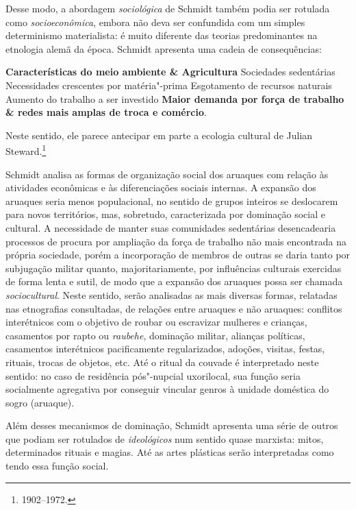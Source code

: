 Desse modo, a abordagem \textit{sociológica} de Schmidt também podia ser
rotulada como \textit{socioeconômica}, embora não deva ser confundida com um
simples determinismo materialista: é muito diferente das teorias
predominantes na etnologia alemã da época. Schmidt apresenta uma cadeia
de consequências: 
\medskip

\textbf{Características do meio ambiente \& Agricultura} \rightarrow{} Sociedades sedentárias \rightarrow{} Necessidades crescentes por matéria"-prima \rightarrow{} Esgotamento de recursos naturais \rightarrow{} Aumento do trabalho a ser investido \rightarrow{} \textbf{Maior demanda por força de trabalho \& redes mais amplas
de troca e comércio}.

\medskip
Neste sentido, ele parece antecipar em parte a
ecologia cultural de Julian Steward.\footnote{1902--1972.}

Schmidt analisa as formas de organização social dos aruaques com
relação às atividades econômicas e às diferenciações sociais internas. A
expansão dos aruaques seria menos populacional, no sentido de grupos
inteiros se deslocarem para novos territórios, mas, sobretudo,
caracterizada por dominação social e cultural. A necessidade de manter
suas comunidades sedentárias desencadearia processos de procura por
ampliação da força de trabalho não mais encontrada na própria sociedade,
porém a incorporação de membros de outras se daria tanto por
subjugação militar quanto, majoritariamente, por influências culturais
exercidas de forma lenta e sutil, de modo que a expansão dos aruaques
possa ser chamada \textit{sociocultural}. Neste sentido, serão analisadas as mais diversas
formas, relatadas nas etnografias consultadas, de relações entre
aruaques e não aruaques: conflitos interétnicos com o objetivo de roubar
ou escravizar mulheres e crianças, casamentos por rapto ou \textit{raubehe}, dominação militar, alianças políticas, casamentos
interétnicos pacificamente regularizados, adoções, visitas, festas,
rituais, trocas de objetos, etc. Até o ritual da couvade é interpretado
neste sentido: no caso de residência pós"-nupcial uxorilocal, sua função
seria socialmente agregativa por conseguir vincular genros à unidade
doméstica do sogro (aruaque).

Além desses mecanismos de dominação, Schmidt apresenta uma série de
outros que podiam ser rotulados de \textit{ideológicos} num sentido quase
marxista: mitos, determinados rituais e magias. Até as artes plásticas
serão interpretadas como tendo essa função social.

